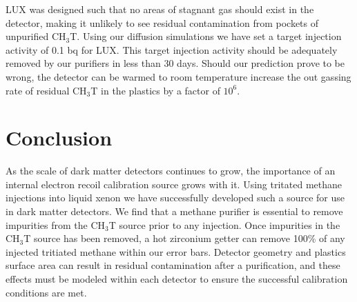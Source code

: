 \documentclass[a4paper,12pt]{article}
\begin{document}
LUX was designed such that no areas of stagnant gas should exist in the detector, making it unlikely to see residual contamination from pockets of unpurified CH$_3$T.  Using our diffusion simulations we have set a target injection activity of 0.1 bq for LUX.  This target injection activity should be adequately removed by our purifiers in less than 30 days.  Should our prediction prove to be wrong, the detector can be warmed to room temperature increase the out gassing rate of residual CH$_3$T in the plastics by a factor of $10^6$.

\section{Conclusion}

As the scale of dark matter detectors continues to grow, the importance of an internal electron recoil calibration source grows with it.  Using tritated methane injections into liquid xenon we have successfully developed such a source for use in dark matter detectors.  We find that a methane purifier is essential to remove impurities from the CH$_3$T source prior to any injection.  Once impurities in the CH$_3$T source has been removed, a hot zirconium getter can remove  100\% of any injected tritiated methane within our error bars.  Detector geometry and plastics surface area can result in residual contamination after a purification, and these effects must be modeled within each detector to ensure the successful calibration conditions are met.
\end{document}
